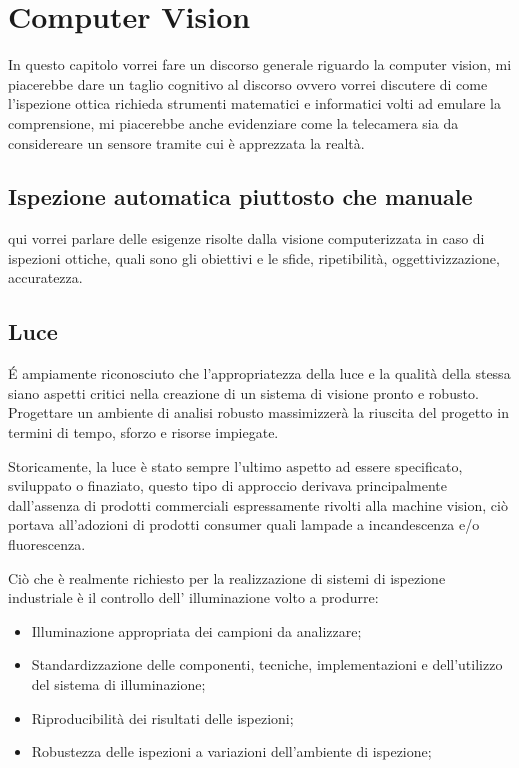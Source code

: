 \chapter{Computer Vision}

In questo capitolo vorrei fare un discorso generale riguardo la computer vision,
mi piacerebbe dare un taglio cognitivo al discorso ovvero vorrei discutere di come
l'ispezione ottica richieda strumenti matematici e informatici volti ad emulare
la comprensione, mi piacerebbe anche evidenziare come la telecamera sia da considereare
un sensore tramite cui è apprezzata la realtà.

\section{Ispezione automatica piuttosto che manuale}

qui vorrei parlare delle esigenze risolte dalla visione computerizzata in caso di
ispezioni ottiche, quali sono gli obiettivi e le sfide, ripetibilità, oggettivizzazione,
accuratezza.

\section{Luce}

\'{E} ampiamente riconosciuto che l'appropriatezza della luce e la qualità della stessa
siano aspetti critici nella creazione di un sistema di visione pronto e robusto.
Progettare un ambiente di analisi robusto massimizzerà la riuscita del progetto in termini
di tempo, sforzo e risorse impiegate.

Storicamente, la luce è stato sempre l'ultimo aspetto ad essere specificato, sviluppato o finaziato, questo tipo di approccio derivava principalmente dall'assenza di prodotti commerciali espressamente rivolti alla machine vision, ciò portava all'adozioni di prodotti consumer quali lampade a incandescenza e/o fluorescenza.

Ciò che è realmente richiesto per la realizzazione di sistemi di ispezione industriale è il controllo dell' illuminazione volto a produrre:

\begin{itemize}
	\item Illuminazione appropriata dei campioni da analizzare;
	\item Standardizzazione delle componenti, tecniche, implementazioni e dell'utilizzo del sistema di illuminazione;
	\item Riproducibilità dei risultati delle ispezioni;
	\item Robustezza delle ispezioni a variazioni dell'ambiente di ispezione;
\end{itemize} 

